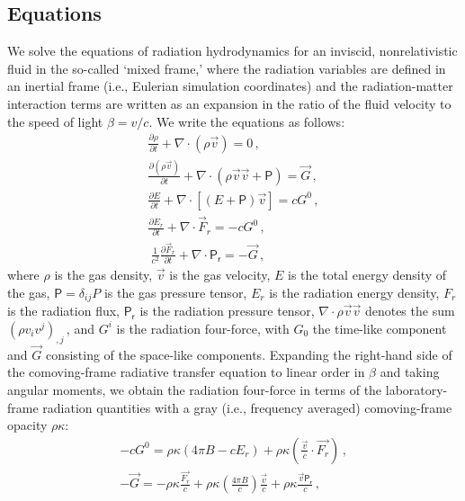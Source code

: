 \documentclass[fleqn,usenatbib]{mnras}
\begin{document}
\subsection{Equations}
We solve the equations of radiation hydrodynamics \citep{Pomraning_1973,Mihalas_1984,Castor_2004} for an inviscid, nonrelativistic fluid in the so-called `mixed frame,' where the radiation variables are defined in an inertial frame (i.e., Eulerian simulation coordinates) and the radiation-matter interaction terms are written as an expansion in the ratio of the fluid velocity to the speed of light $\beta = v/c$. We write the equations as follows:
\begin{align}
    \frac{\partial \rho}{\partial t} + \nabla \cdot (\rho \vec{v}) = 0 \, , \\
    \frac{\partial (\rho \vec{v})}{\partial t} + \nabla \cdot (\rho \vec{v} \vec{v} + \mathsf{P}) = \vec{G} \, , \\
    \frac{\partial E}{\partial t} + \nabla \cdot \left[(E + \mathsf{P})\vec{v}\right] = c G^0 \, , \\
    \frac{\partial E_r}{\partial t} + \nabla \cdot {\vec{F}_r} = -c G^0 \, , \\\
    \frac{1}{c^2}\frac{\partial \vec{F}_r}{\partial t} + \nabla \cdot \mathsf{P_r} = -\vec{G} \, ,
\end{align}
where $\rho$ is the gas density, $\vec{v}$ is the gas velocity, $E$ is the total energy density of the gas, $\mathsf{P} = \delta_{ij} P$ is the gas pressure tensor, $E_r$ is the radiation energy density, $F_r$ is the radiation flux, $\mathsf{P_r}$ is the radiation pressure tensor, $\nabla \cdot \rho \vec{v} \vec{v}$ denotes the sum $(\rho v_i v^j)_{,j}\,$, and $G^i$ is the radiation four-force, with $G_0$ the time-like component and $\vec{G}$ consisting of the space-like components. Expanding the right-hand side of the comoving-frame radiative transfer equation to linear order in $\beta$ and taking angular moments, we obtain the radiation four-force in terms of the laboratory-frame radiation quantities with a gray (i.e., frequency averaged) comoving-frame opacity $\rho \kappa$:
\begin{align}
-c G^0 = \rho \kappa(4 \pi B - c E_r) + \rho \kappa \left( \frac{\vec{v}}{c} \cdot \vec{F_r} \right) \, , \\
-\vec{G} = -\rho \kappa \frac{\vec{F_r}}{c} + \rho \kappa \left(\frac{4 \pi B}{c}\right) \frac{\vec{v}}{c} + \rho \kappa \frac{\vec{v}\mathsf{P_r}}{c} \, ,
\end{align}
\end{document}
